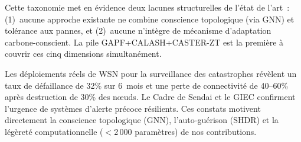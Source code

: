 \begin{table}[htbp]
\centering
\caption{Taxonomie des approches de routage pour les WSN selon cinq dimensions.}
\label{tab:routing-taxonomy}
\end{table}

Cette taxonomie met en évidence deux lacunes structurelles de l'état de l'art~: (1)~aucune approche existante ne combine conscience topologique (via GNN) et tolérance aux pannes, et (2)~aucune n'intègre de mécanisme d'adaptation carbone-conscient. La pile GAPF+CALASH+CASTER-ZT est la première à couvrir ces cinq dimensions simultanément.

Les déploiements réels de WSN pour la surveillance des catastrophes \cite{Aslan2012ForestFireWSN,AbuGhazaleh2007WSNSurvivability} révèlent un taux de défaillance de 32\% sur 6~mois et une perte de connectivité de 40--60\% après destruction de 30\% des n\oe{}uds. Le Cadre de Sendai \cite{UNDRR2015Sendai} et le GIEC \cite{IPCC2021AR6} confirment l'urgence de systèmes d'alerte précoce résilients. Ces constats motivent directement la conscience topologique (GNN), l'auto-guérison (SHDR) et la légèreté computationnelle ($<$2\,000 paramètres) de nos contributions.


